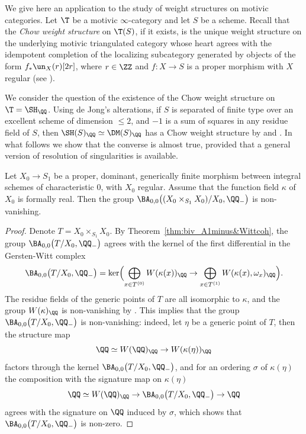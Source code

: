 \begin{num}
We give here an application to the study of weight structures on motivic categories. Let $\T$ be a motivic $\infty$-category and let $S$ be a scheme. Recall that the \emph{Chow weight structure} on $\T(S)$, if it exists, is the unique weight structure on the underlying motivic triangulated category whose heart agrees with the idempotent completion of the localizing subcategory generated by objects of the form $f_*\un_X(r)[2r]$, where $r\in\ZZ$ and $f:X\to S$ is a proper morphism with $X$ regular (see \cite[Th.\,2.1]{Bondarkorweight}).

We consider the question of the existence of the Chow weight structure on $\T=\SH_\QQ$.
Using de Jong's alterations, if $S$ is separated of finite type over an excellent scheme of dimension $\leqslant 2$, and $-1$ is a sum of squares in any residue field of $S$, then $\SH(S)_{\QQ}\simeq\DM(S)_{\QQ}$ has a Chow weight structure by \cite{Hebert} and \cite{Bondarkorweight}. In what follows we show that the converse is almost true, provided that a general version of resolution of singularities is available.

\begin{lm}
\label{lm:BMWnonvan}
Let $X_0\to S_1$ be a proper, dominant, generically finite morphism between integral schemes of characteristic $0$, with $X_0$ regular. Assume that the function field $\kappa$ of $X_0$ is formally real. Then the group $\BA_{0,0}\big((X_0\times_{S_1}X_0)/X_0,\QQ_-\big)$ is non-vanishing.
\end{lm}
\begin{proof}
Denote $T=X_0\times_{S_1}X_0$. By Theorem~\ref{thm:biv_A1minus&Wittcoh}, the group $\BA_{0,0}\big(T/X_0,\QQ_-\big)$ agrees with the kernel of the first differential in the Gersten-Witt complex
\[
\BA_{0,0}\big(T/X_0,\QQ_-\big)
=
\ker\Bigl(\bigoplus_{x\in T^{(0)}}W(\kappa(x))_\QQ\to\bigoplus_{x\in T^{(1)}}W(\kappa(x),\omega_x)_\QQ\Bigr).
\]
The residue fields of the generic points of $T$ are all isomorphic to $\kappa$, and the group $W(\kappa)_\QQ$ is non-vanishing by \cite[VIII\,6.15]{LamQuadratic}.
This implies that the group $\BA_{0,0}\big(T/X_0,\QQ_-\big)$ is non-vanishing: indeed, let $\eta$ be a generic point of $T$, then the structure map
\[\QQ\simeq W(\QQ)_\QQ\to W(\kappa(\eta))_\QQ\]
factors through the kernel $\BA_{0,0}\big(T/X_0,\QQ_-\big)$, and for an ordering $\sigma$ of $\kappa(\eta)$ the composition with the signature map on $\kappa(\eta)$
\[\QQ\simeq W(\QQ)_\QQ\to \BA_{0,0}\big(T/X_0,\QQ_-\big)\to\QQ\]
agrees with the signature on $\QQ$ induced by $\sigma$, which shows that $\BA_{0,0}\big(T/X_0,\QQ_-\big)$ is non-zero.
\end{proof}


\end{num}

